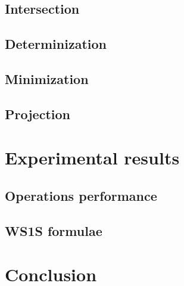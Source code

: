 \documentclass[pdflatex,sn-mathphys-num]{sn-jnl}%
\theoremstyle{thmstyleone}%
\theoremstyle{thmstyletwo}%
\theoremstyle{thmstylethree}%
\begin{document}
    \subsection{Intersection}
    \subsection{Determinization}
    \subsection{Minimization}
    \subsection{Projection}

\section{Experimental results}
    \subsection{Operations performance}
    \subsection{WS1S formulae}

\section{Conclusion}







\end{document}
